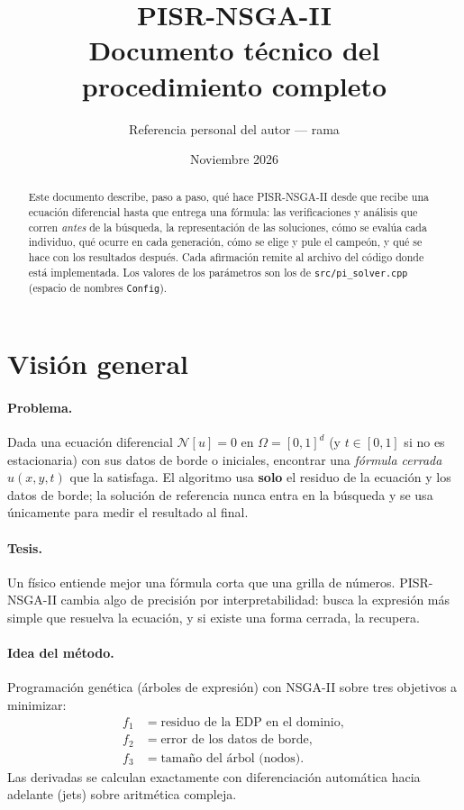 \documentclass[11pt,a4paper]{article}
\title{\color{accent}\bfseries PISR-NSGA-II\\[4pt]\large Documento técnico del procedimiento completo}
\author{Referencia personal del autor --- rama \code{grade}}
\date{Noviembre 2026}
\newcommand{\code}[1]{\texttt{\small #1}}
\begin{document}
\sloppy
\maketitle
\thispagestyle{fancy}

\begin{abstract}
Este documento describe, paso a paso, qué hace PISR-NSGA-II desde que recibe una ecuación diferencial
hasta que entrega una fórmula: las verificaciones y análisis que corren \emph{antes} de la búsqueda, la
representación de las soluciones, cómo se evalúa cada individuo, qué ocurre en cada generación, cómo se
elige y pule el campeón, y qué se hace con los resultados después. Cada afirmación remite al archivo del
código donde está implementada. Los valores de los parámetros son los de \code{src/pi\_solver.cpp}
(espacio de nombres \code{Config}).
\end{abstract}

\tableofcontents
\newpage

\section{Visión general}

\paragraph{Problema.} Dada una ecuación diferencial $\mathcal{N}[u] = 0$ en $\Omega=[0,1]^d$ (y
$t\in[0,1]$ si no es estacionaria) con sus datos de borde o iniciales, encontrar una \emph{fórmula
cerrada} $u(x,y,t)$ que la satisfaga. El algoritmo usa \textbf{solo} el residuo de la ecuación y los
datos de borde; la solución de referencia nunca entra en la búsqueda y se usa únicamente para medir el
resultado al final.

\paragraph{Tesis.} Un físico entiende mejor una fórmula corta que una grilla de números. PISR-NSGA-II
cambia algo de precisión por interpretabilidad: busca la expresión más simple que resuelva la ecuación,
y si existe una forma cerrada, la recupera.

\paragraph{Idea del método.} Programación genética (árboles de expresión) con NSGA-II sobre tres
objetivos a minimizar:
\begin{align*}
f_1 &= \text{residuo de la EDP en el dominio},\\
f_2 &= \text{error de los datos de borde},\\
f_3 &= \text{tamaño del árbol (nodos)}.
\end{align*}
Las derivadas se calculan exactamente con diferenciación automática hacia adelante (jets) sobre
aritmética compleja.
\end{document}
